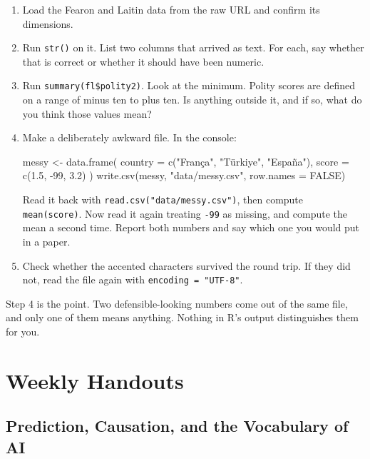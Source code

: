 \documentclass[
  a4paper,
]{scrbook}
\newenvironment{Shaded}{\begin{snugshade}}{\end{snugshade}}
\newcommand{\AttributeTok}[1]{\textcolor[rgb]{0.40,0.45,0.13}{#1}}
\newcommand{\ConstantTok}[1]{\textcolor[rgb]{0.56,0.35,0.01}{#1}}
\newcommand{\DecValTok}[1]{\textcolor[rgb]{0.68,0.00,0.00}{#1}}
\newcommand{\FloatTok}[1]{\textcolor[rgb]{0.68,0.00,0.00}{#1}}
\newcommand{\FunctionTok}[1]{\textcolor[rgb]{0.28,0.35,0.67}{#1}}
\newcommand{\NormalTok}[1]{\textcolor[rgb]{0.00,0.23,0.31}{#1}}
\newcommand{\OtherTok}[1]{\textcolor[rgb]{0.00,0.23,0.31}{#1}}
\newcommand{\SpecialCharTok}[1]{\textcolor[rgb]{0.37,0.37,0.37}{#1}}
\newcommand{\StringTok}[1]{\textcolor[rgb]{0.13,0.47,0.30}{#1}}
\begin{document}
\begin{enumerate}
\def\labelenumi{\arabic{enumi}.}
\item
  Load the Fearon and Laitin data from the raw URL and confirm its
  dimensions.
\item
  Run \texttt{str()} on it. List two columns that arrived as text. For
  each, say whether that is correct or whether it should have been
  numeric.
\item
  Run \texttt{summary(fl\$polity2)}. Look at the minimum. Polity scores
  are defined on a range of minus ten to plus ten. Is anything outside
  it, and if so, what do you think those values mean?
\item
  Make a deliberately awkward file. In the console:

\begin{Shaded}
\begin{Highlighting}[]
\NormalTok{messy }\OtherTok{\textless{}{-}} \FunctionTok{data.frame}\NormalTok{(}
  \AttributeTok{country =} \FunctionTok{c}\NormalTok{(}\StringTok{"França"}\NormalTok{, }\StringTok{"Türkiye"}\NormalTok{, }\StringTok{"España"}\NormalTok{),}
  \AttributeTok{score   =} \FunctionTok{c}\NormalTok{(}\FloatTok{1.5}\NormalTok{, }\SpecialCharTok{{-}}\DecValTok{99}\NormalTok{, }\FloatTok{3.2}\NormalTok{)}
\NormalTok{)}
\FunctionTok{write.csv}\NormalTok{(messy, }\StringTok{"data/messy.csv"}\NormalTok{, }\AttributeTok{row.names =} \ConstantTok{FALSE}\NormalTok{)}
\end{Highlighting}
\end{Shaded}

  Read it back with \texttt{read.csv("data/messy.csv")}, then compute
  \texttt{mean(score)}. Now read it again treating \texttt{-99} as
  missing, and compute the mean a second time. Report both numbers and
  say which one you would put in a paper.
\item
  Check whether the accented characters survived the round trip. If they
  did not, read the file again with \texttt{encoding\ =\ "UTF-8"}.
\end{enumerate}

Step 4 is the point. Two defensible-looking numbers come out of the same
file, and only one of them means anything. Nothing in R's output
distinguishes them for you.

\part{Weekly Handouts}

\chapter{Prediction, Causation, and the Vocabulary of
AI}\label{prediction-causation-and-the-vocabulary-of-ai}
\end{document}
